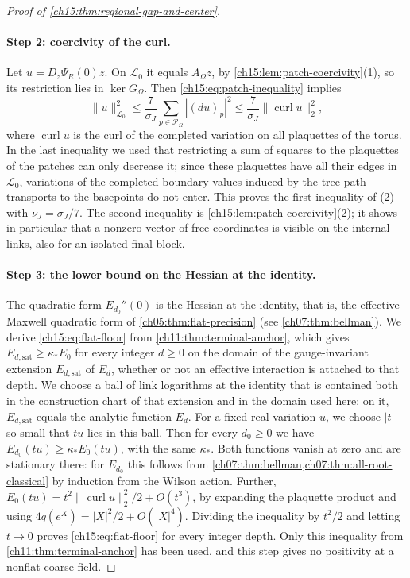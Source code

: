\begin{proof}[Proof of \cref{ch15:thm:regional-gap-and-center}]
\paragraph{Step 2: coercivity of the curl.}
Let $u=D_z\Psi_R(0)z$. On $\mathcal L_0$ it equals $A_\Omega z$, by \cref{ch15:lem:patch-coercivity}(1), so its restriction lies in $\ker G_\Omega$. Then \eqref{ch15:eq:patch-inequality} implies
\[
 \|u\|_{\mathcal L_0}^2\le\frac7{\sigma_J}\sum_{p\in\mathcal P_\Omega}|(du)_p|^2
 \le\frac7{\sigma_J}\|\operatorname{curl}u\|_2^2,
\]
where $\operatorname{curl}u$ is the curl of the completed variation on all plaquettes of the torus. In the last inequality we used that restricting a sum of squares to the plaquettes of the patches can only decrease it; since these plaquettes have all their edges in $\mathcal L_0$, variations of the completed boundary values induced by the tree-path transports to the basepoints do not enter. This proves the first inequality of (2) with $\nu_J=\sigma_J/7$. The second inequality is \cref{ch15:lem:patch-coercivity}(2); it shows in particular that a nonzero vector of free coordinates is visible on the internal links, also for an isolated final block.

\paragraph{Step 3: the lower bound on the Hessian at the identity.}
The quadratic form $E_{d_0}''(0)$ is the Hessian at the identity, that is, the effective Maxwell quadratic form of \cref{ch05:thm:flat-precision} (see \cref{ch07:thm:bellman}). We derive \eqref{ch15:eq:flat-floor} from \cref{ch11:thm:terminal-anchor}, which gives $E_{d,\mathrm{sat}}\ge\kappa_*E_0$ for every integer $d\ge0$ on the domain of the gauge-invariant extension $E_{d,\mathrm{sat}}$ of $E_d$, whether or not an effective interaction is attached to that depth. We choose a ball of link logarithms at the identity that is contained both in the construction chart of that extension and in the domain used here; on it, $E_{d,\mathrm{sat}}$ equals the analytic function $E_d$. For a fixed real variation $u$, we choose $|t|$ so small that $tu$ lies in this ball. Then for every $d_0\ge0$ we have $E_{d_0}(tu)\ge\kappa_*E_0(tu)$, with the same $\kappa_*$. Both functions vanish at zero and are stationary there: for $E_{d_0}$ this follows from \cref{ch07:thm:bellman,ch07:thm:all-root-classical} by induction from the Wilson action. Further, $E_0(tu)=t^2\|\operatorname{curl}u\|_2^2/2+O(t^3)$, by expanding the plaquette product and using $4q(e^X)=|X|^2/2+O(|X|^4)$. Dividing the inequality by $t^2/2$ and letting $t\to0$ proves \eqref{ch15:eq:flat-floor} for every integer depth. Only this inequality from \cref{ch11:thm:terminal-anchor} has been used, and this step gives no positivity at a nonflat coarse field.


\end{proof}
